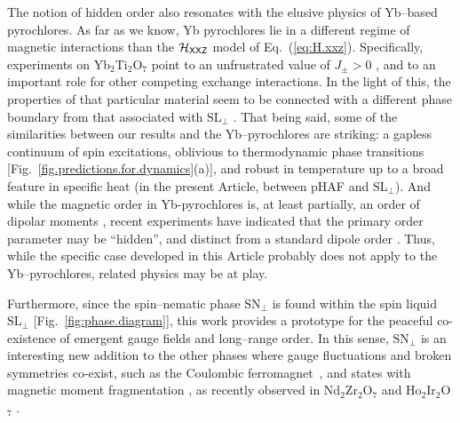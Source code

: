 \documentclass[apsrev4-1,prx,superscriptaddress,floatfix,twocolumn,longbibliography]{revtex4-1}
\begin{document}

The notion of hidden order also resonates with the elusive physics of 
Yb--based pyrochlores. 
%
As far as we know, Yb pyrochlores lie in a different regime of magnetic interactions
 than the $\mathcal{H}_{\sf XXZ}$ model of Eq.~(\ref{eq:H.xxz}).
%
Specifically, experiments on Yb$_2$Ti$_2$O$_7$ point to an unfrustrated 
value of $J_{\pm}>0$ \cite{ross11-PRX1,Robert2015,Thompson17}, and to an  
important role for other competing exchange interactions.
%
In the light of this, the properties of that particular material seem to be connected
with a different phase boundary from that associated with 
$\text{SL}_\perp$ \cite{jaubert15, yan17,hallas-arXiv.1708.01312}.
%
That being said, some of the similarities between our results 
and the Yb--pyrochlores are striking: a gapless continuum of spin excitations, 
oblivious to thermodynamic phase transitions 
\cite{Ross2009,Maisuradze2015,hallas16-PRB93.100403,gaudet16} 
[Fig.~\ref{fig.predictions.for.dynamics}(a)], and robust in temperature 
up to a broad feature in specific heat \cite{hallas16-PRB93.100403} 
(in the present Article, between pHAF and $\text{SL}_\perp$). 
%
And while the magnetic order in 
Yb-pyrochlores is, at least partially, an order of dipolar moments 
\cite{Yasui2003a,chang12-NatCommun3,Yaouanc2013a,dun13,lhotel14,hallas16-PRB93.104405}, 
recent experiments have indicated that the primary order parameter may be ``hidden'', 
and distinct from a standard dipole order \cite{hallas16-PRB93.100403}. 
%
Thus, while the specific case developed in this Article 
probably does not apply to the Yb--pyrochlores, related physics may be at play.


Furthermore, since the spin--nematic phase $\text{SN}_\perp$ is found 
within the spin liquid $\text{SL}_\perp$ [Fig.~\ref{fig:phase.diagram}], this work 
provides a prototype for the peaceful co-existence of emergent 
gauge fields and long--range order. 
%
In this sense, $\text{SN}_\perp$ is an interesting 
new addition to the other phases where gauge fluctuations and broken symmetries 
co-exist, such as the Coulombic ferromagnet~\cite{savary12-PRL108,Powell2015}, 
and states with magnetic moment fragmentation \cite{Brooks-Bartlett2014}, 
as recently observed in Nd$_2$Zr$_2$O$_7$ \cite{Petit2016,Benton16} 
and Ho$_2$Ir$_2$O$_7$ \cite{Lefrancois17}.

\end{document}

